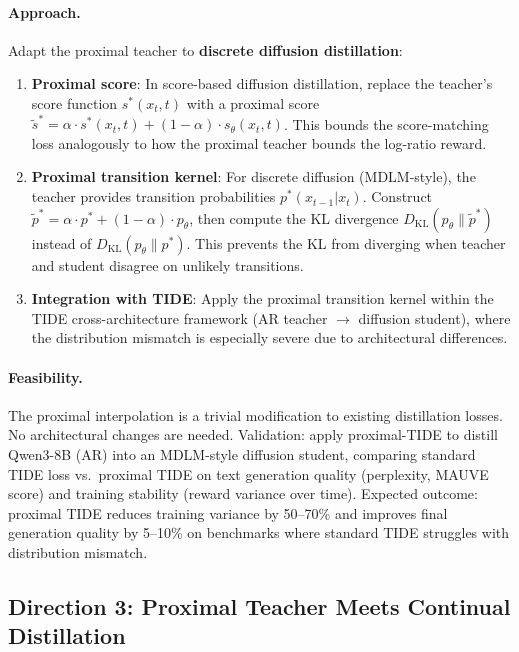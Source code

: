 \documentclass[11pt,a4paper]{article}
\begin{document}
\paragraph{Approach.} Adapt the proximal teacher to \textbf{discrete diffusion distillation}:
\begin{enumerate}
\item \textbf{Proximal score}: In score-based diffusion distillation, replace the teacher's score function $s^*(x_t, t)$ with a proximal score $\tilde{s}^* = \alpha \cdot s^*(x_t, t) + (1 - \alpha) \cdot s_\theta(x_t, t)$. This bounds the score-matching loss analogously to how the proximal teacher bounds the log-ratio reward.
\item \textbf{Proximal transition kernel}: For discrete diffusion (MDLM-style), the teacher provides transition probabilities $p^*(x_{t-1} | x_t)$. Construct $\tilde{p}^* = \alpha \cdot p^* + (1 - \alpha) \cdot p_\theta$, then compute the KL divergence $D_{\mathrm{KL}}(p_\theta \| \tilde{p}^*)$ instead of $D_{\mathrm{KL}}(p_\theta \| p^*)$. This prevents the KL from diverging when teacher and student disagree on unlikely transitions.
\item \textbf{Integration with TIDE}: Apply the proximal transition kernel within the TIDE cross-architecture framework (AR teacher $\to$ diffusion student), where the distribution mismatch is especially severe due to architectural differences.
\end{enumerate}

\paragraph{Feasibility.} The proximal interpolation is a trivial modification to existing distillation losses. No architectural changes are needed. Validation: apply proximal-TIDE to distill Qwen3-8B (AR) into an MDLM-style diffusion student, comparing standard TIDE loss vs.\ proximal TIDE on text generation quality (perplexity, MAUVE score) and training stability (reward variance over time). Expected outcome: proximal TIDE reduces training variance by 50--70\% and improves final generation quality by 5--10\% on benchmarks where standard TIDE struggles with distribution mismatch.

\subsection{Direction 3: Proximal Teacher Meets Continual Distillation}
\end{document}
